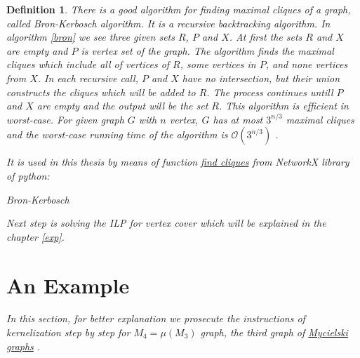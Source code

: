 \documentclass[12pt]{article}
\theoremstyle{slplain}
\newtheorem{defi}{Definition}
\begin{document}
\begin{defi}
There is a good algorithm for finding maximal cliques of a graph, called Bron-Kerbosch\cite{bron} algorithm. It is a recursive  backtracking algorithm. In algorithm \ref{bron} we see three given sets $R$, $P$ and $X$. At first the sets $R$ and $X$ are empty and $P$ is vertex set of the graph. The algorithm finds the maximal cliques which include all of vertices of $R$, some vertices in $P$, and none vertices from $X$. In each recursive call, $P$ and $X$ have no intersection, but their union constructs the cliques which will be added to $R$. The process continues untill $P$ and $X$ are empty and the output will be the set $R$. This algorithm is efficient in worst-case. For given graph $G$ with $n$ vertex, $G$ has at most $3^{n/3}$ maximal cliques and the worst-case running time of the algorithm is $\mathcal{O}(3^{n/3})$ \cite{moon}. 


It is used in this thesis by means of function \href{https://networkx.github.io/documentation/networkx-1.10/reference/generated/networkx.algorithms.clique.find_cliques.html}{find cliques} from NetworkX library of python:

\vspace{1cm}

\begin{algorithm}\label{bron}
\begin{algorithmic}

\EndFunction
\end{algorithmic}
\caption{Bron-Kerbosch}
\end{algorithm}

\vspace{1cm}

Next step is solving the ILP for vertex cover which will be explained in the chapter \ref{exp}.

\newpage


\section{An Example}{\label{section}}
In this section, for better explanation we prosecute the instructions of kernelization 
step by step for $M_4 = \mu(M_3)$ graph, the third graph of \href{https://en.wikipedia.org/wiki/Mycielskian}{Mycielski graphs} \cite{mycielski}.


\end{defi}
\end{document}
